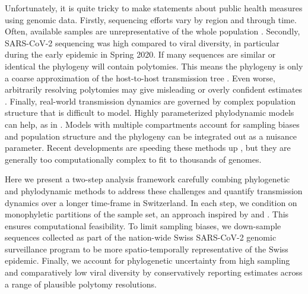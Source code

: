 \documentclass[9pt,twoside,lineno]{pnas-new} %
\begin{document}
Unfortunately, it is quite tricky to make statements about public health measures using genomic data. Firstly, sequencing efforts vary by region and through time. Often, available samples are unrepresentative of the whole population \cite{Villabona-Arenas2020, DeMaio2015}. Secondly, SARS-CoV-2 sequencing was high compared to viral diversity, in particular during the early epidemic in Spring 2020. If many sequences are similar or identical the phylogeny will contain polytomies. This means the phylogeny is only a coarse approximation of the  host-to-host transmission tree \cite{Villabona-Arenas2020}. Even worse, arbitrarily resolving polytomies may give misleading or overly confident estimates \cite{Morel2021}. Finally, real-world transmission dynamics are governed by complex population structure that is difficult to model. Highly parameterized phylodynamic models can help, as in \cite{Miller2020, Geoghegan2020a, Muller2020a}. Models with multiple compartments account for sampling biases and population structure and the phylogeny can be integrated out as a nuisance parameter. Recent developments are speeding these methods up \cite{Lemey2021}, but they are generally too computationally complex to fit to thousands of genomes.

Here we present a two-step analysis framework carefully combing phylogenetic and phylodynamic methods to address these challenges and quantify transmission dynamics over a longer time-frame in Switzerland. In each step, we condition on monophyletic partitions of the sample set, an approach inspired by  \cite{Muller2020} and \cite{DuPlessis}. This ensures computational feasibility. To limit sampling biases, we down-sample sequences collected as part of the nation-wide Swiss SARS-CoV-2 genomic surveillance program to be more spatio-temporally representative of the Swiss epidemic. Finally, we account for phylogenetic uncertainty from high sampling and comparatively low viral diversity by conservatively reporting estimates across a range of plausible polytomy resolutions.
\end{document}
